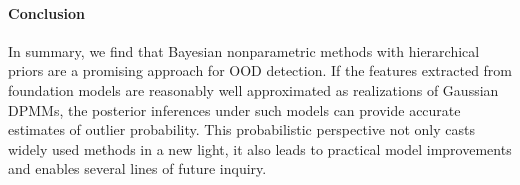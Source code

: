 \paragraph{Conclusion}
In summary, we find that Bayesian nonparametric methods with hierarchical priors are a promising approach for OOD detection.
If the features extracted from foundation models are reasonably well approximated as realizations of Gaussian DPMMs, the posterior inferences under such models can provide accurate estimates of outlier probability.
This probabilistic perspective not only casts widely used methods in a new light, it also leads to practical model improvements and enables several lines of future inquiry.
